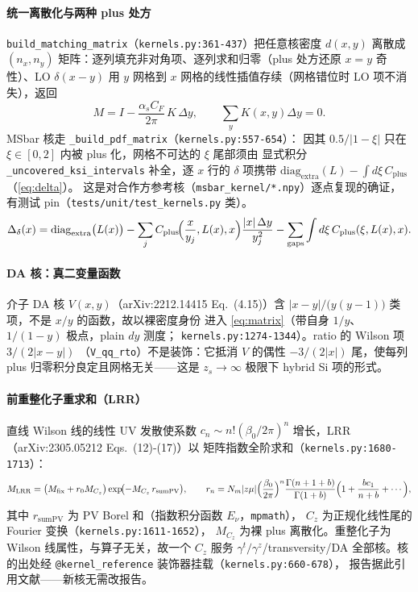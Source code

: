 \documentclass[UTF8]{ctexart}
\begin{document}
\paragraph{统一离散化与两种 plus 处方}
\texttt{build\_matching\_matrix}（\texttt{\nolinkurl{kernels.py:361-437}}）把任意核密度
$d(x,y)$ 离散成 $(n_x,n_y)$ 矩阵：逐列填充非对角项、逐列求和归零（plus 处方还原
$x=y$ 奇性）、LO $\delta(x-y)$ 用 $y$ 网格到 $x$ 网格的线性插值存续（网格错位时
LO 项不消失），返回
\begin{equation}\label{eq:matrix}
M=I-\frac{\alpha_s C_F}{2\pi}\,K\,\Delta y,\qquad
\sum_y K(x,y)\Delta y=0.
\end{equation}
MSbar 核走 \texttt{\_build\_pdf\_matrix}（\texttt{\nolinkurl{kernels.py:557-654}}）：
因其 $0.5/|1-\xi|$ 只在 $\xi\in[0,2]$ 内被 plus 化，网格不可达的 $\xi$ 尾部须由
显式积分 \texttt{\_uncovered\_ksi\_intervals} 补全，逐 $x$ 行的 $\delta$ 项携带
$\mathrm{diag}_{\mathrm{extra}}(L)-\int d\xi\,C_{\mathrm{plus}}$（\eqref{eq:delta}）。
这是对合作方参考核（\texttt{msbar\_kernel/*.npy}）逐点复现的\textcolor{accent}{确证}，
有测试 pin（\texttt{\nolinkurl{tests/unit/test_kernels.py}} 类）。
\begin{equation}\label{eq:delta}
\Delta_{\delta}(x)=\mathrm{diag}_{\mathrm{extra}}\bigl(L(x)\bigr)-\sum_j
C_{\mathrm{plus}}\!\Bigl(\frac{x}{y_j},L(x),x\Bigr)\frac{|x|\,\Delta y}{y_j^2}
-\sum_{\mathrm{gaps}}\int d\xi\,C_{\mathrm{plus}}(\xi,L(x),x).
\end{equation}

\paragraph{DA 核：真二变量函数} 介子 DA 核 $V(x,y)$（arXiv:2212.14415
Eq.~(4.15)）含 $|x-y|/\bigl(y(y-1)\bigr)$ 类项，不是 $x/y$ 的函数，故以裸密度身份
进入 \eqref{eq:matrix}（带自身 $1/y$、$1/(1-y)$ 极点，plain $dy$ 测度；
\texttt{\nolinkurl{kernels.py:1274-1344}}）。ratio 的 Wilson 项 $3/(2|x-y|)$
（\texttt{V\_qq\_rto}）不是装饰：它抵消 $V$ 的偶性 $-3/(2|x|)$ 尾，使每列
plus 归零积分良定且网格无关——这是 $z_s\to\infty$ 极限下 hybrid Si 项的形式。

\paragraph{前重整化子重求和（LRR）} 直线 Wilson 线的线性 UV 发散使系数
$c_n\sim n!(\beta_0/2\pi)^n$ 增长，LRR（arXiv:2305.05212 Eqs.~(12)-(17)）以
矩阵指数全阶求和（\texttt{\nolinkurl{kernels.py:1680-1713}}）：
\begin{equation}\label{eq:lrr}
M_{\mathrm{LRR}}=\bigl(M_{\mathrm{fix}}+r_0M_{C_z}\bigr)\exp\!\bigl(-M_{C_z}\,r_{\mathrm{sumPV}}\bigr),
\qquad r_n=N_m|z\mu|\Bigl(\frac{\beta_0}{2\pi}\Bigr)^n
\frac{\Gamma(n+1+b)}{\Gamma(1+b)}\Bigl(1+\frac{bc_1}{n+b}+\cdots\Bigr),
\end{equation}
其中 $r_{\mathrm{sumPV}}$ 为 PV Borel 和（指数积分函数 $E_\nu$，\texttt{mpmath}），
$C_z$ 为正规化线性尾的 Fourier 变换（\texttt{\nolinkurl{kernels.py:1611-1652}}），
$M_{C_z}$ 为裸 plus 离散化。重整化子为 Wilson 线属性，与算子无关，故一个
$C_z$ 服务 $\gamma^t/\gamma^z$/transversity/DA 全部核。核的出处经
\texttt{@kernel\_reference} 装饰器挂载（\texttt{\nolinkurl{kernels.py:660-678}}），
报告据此引用文献——新核无需改报告。
\end{document}
